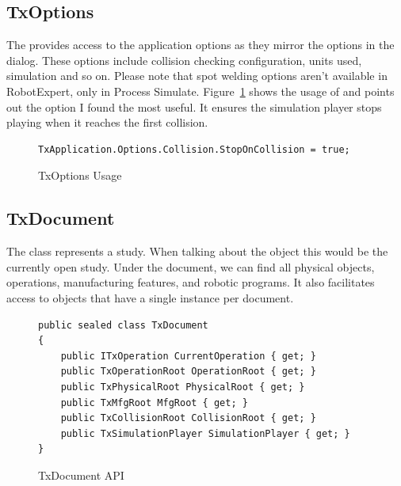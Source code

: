 \subsection{TxOptions}
\label{ch:TxOptions}

The  provides access to the application options as they mirror the options in the  dialog.
These options include collision checking configuration, units used, simulation and so on.
Please note that spot welding options aren't available in RobotExpert, only in Process Simulate. Figure~\ref{fig:CodeStopOnCollision} shows the usage of and points out the option I found the most useful. It ensures the simulation player stops playing when it reaches the first collision.

\begin{figure}[H]
    \caption{TxOptions Usage}
    \centering
    \begin{verbatim}
TxApplication.Options.Collision.StopOnCollision = true;
    \end{verbatim}
    \label{fig:CodeStopOnCollision}
\end{figure}

\subsection{TxDocument}
\label{ch:TxDocument}

The  class represents a study. 
When talking about the  object this would be the currently open study. 
Under the document, we can find all physical
objects, operations, manufacturing features, and robotic programs. 
It also facilitates access to objects that have a single instance per document.

\begin{figure}[H]
    \caption{TxDocument API}
    \centering
    \begin{verbatim}
public sealed class TxDocument
{
    public ITxOperation CurrentOperation { get; }
    public TxOperationRoot OperationRoot { get; }
    public TxPhysicalRoot PhysicalRoot { get; }
    public TxMfgRoot MfgRoot { get; }
    public TxCollisionRoot CollisionRoot { get; }
    public TxSimulationPlayer SimulationPlayer { get; }
}
    \end{verbatim}
    \label{fig:CodeTxDocument}
\end{figure}

